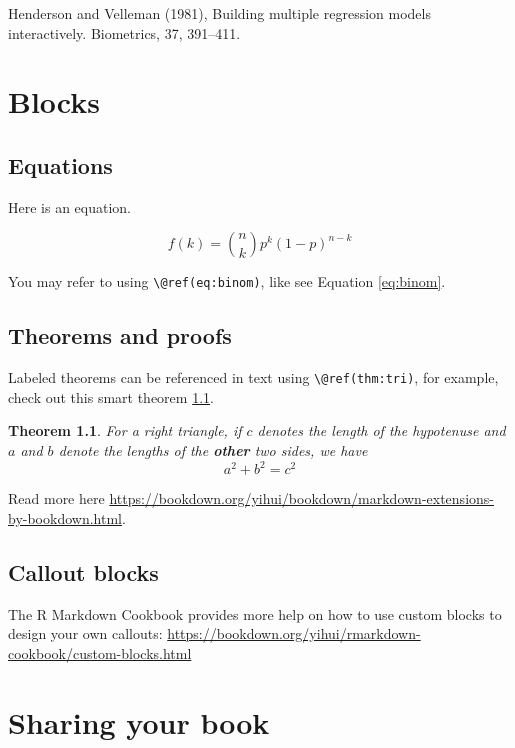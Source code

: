 \documentclass[
]{book}
\newtheorem{theorem}{Theorem}[chapter]
\theoremstyle{definition}
\theoremstyle{definition}
\theoremstyle{definition}
\theoremstyle{definition}
\theoremstyle{remark}
\begin{document}
Henderson and Velleman (1981), Building multiple regression models interactively. Biometrics, 37, 391--411.

\hypertarget{blocks}{%
\chapter{Blocks}\label{blocks}}

\hypertarget{equations}{%
\section{Equations}\label{equations}}

Here is an equation.

\begin{equation} 
  f\left(k\right) = \binom{n}{k} p^k\left(1-p\right)^{n-k}
  \label{eq:binom}
\end{equation}

You may refer to using \texttt{\textbackslash{}@ref(eq:binom)}, like see Equation \eqref{eq:binom}.

\hypertarget{theorems-and-proofs}{%
\section{Theorems and proofs}\label{theorems-and-proofs}}

Labeled theorems can be referenced in text using \texttt{\textbackslash{}@ref(thm:tri)}, for example, check out this smart theorem \ref{thm:tri}.

\begin{theorem}
\protect\hypertarget{thm:tri}{}\label{thm:tri}For a right triangle, if \(c\) denotes the \emph{length} of the hypotenuse
and \(a\) and \(b\) denote the lengths of the \textbf{other} two sides, we have
\[a^2 + b^2 = c^2\]
\end{theorem}

Read more here \url{https://bookdown.org/yihui/bookdown/markdown-extensions-by-bookdown.html}.

\hypertarget{callout-blocks}{%
\section{Callout blocks}\label{callout-blocks}}

The R Markdown Cookbook provides more help on how to use custom blocks to design your own callouts: \url{https://bookdown.org/yihui/rmarkdown-cookbook/custom-blocks.html}

\hypertarget{sharing-your-book}{%
\chapter{Sharing your book}\label{sharing-your-book}}
\end{document}
